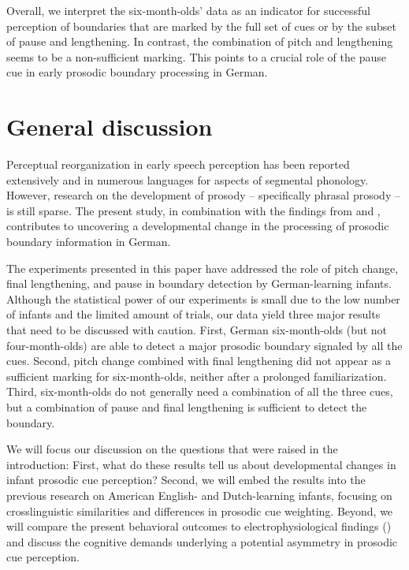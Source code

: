\documentclass[output=paper]{langscibook}
\begin{document}
Overall, we interpret the six-month-olds’ data as an indicator for successful perception of boundaries that are marked by the full set of cues or by the subset of pause and lengthening. In contrast, the combination of pitch and lengthening seems to be a non-sufficient marking. This points to a crucial role of the pause cue in early prosodic boundary processing in German.


\section{General discussion}
Perceptual reorganization in early speech perception has been reported extensively and in numerous languages for aspects of segmental phonology. However, research on the development of prosody – specifically phrasal prosody – is still sparse. The present study, in combination with the findings from \citet{Wellmann2012} and \citet{Holzgrefe-Lang2016, Holzgrefe-Lang2018}, contributes to uncovering a developmental change in the processing of prosodic boundary information in German.

\begin{sloppypar}
The experiments presented in this paper have addressed the role of pitch change, final lengthening, and pause in boundary detection by German-learning infants. Although the statistical power of our experiments is small due to the low number of infants and the limited amount of trials, our data yield three major results that need to be discussed with caution. First, German six-month-olds (but not four-month-olds) are able to detect a major prosodic boundary signaled by all the cues. Second, pitch change combined with final lengthening did not appear as a sufficient marking for six-month-olds, neither after a prolonged familiarization. Third, six-month-olds do not generally need a combination of all the three cues, but a combination of pause and final lengthening is sufficient to detect the boundary.
\end{sloppypar}

We will focus our discussion on the questions that were raised in the introduction: First, what do these results tell us about developmental changes in infant prosodic cue perception? Second, we will embed the results into the previous research on American English- and Dutch-learning infants, focusing on crosslinguistic similarities and differences in prosodic cue weighting. Beyond, we will compare the present behavioral outcomes to electrophysiological findings (\citealt{Holzgrefe-Lang2018}) and discuss the cognitive demands underlying a potential asymmetry in prosodic cue perception.
\end{document}
